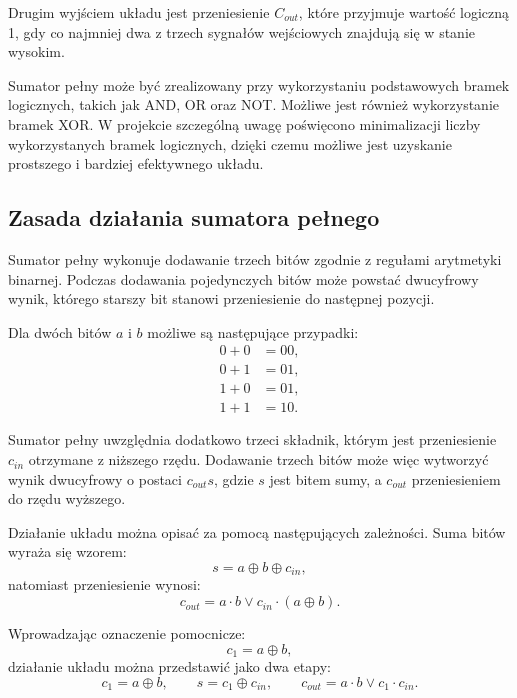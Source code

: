 Drugim wyjściem układu jest przeniesienie $C_{out}$, które przyjmuje wartość logiczną 1, gdy co najmniej dwa z trzech sygnałów wejściowych znajdują się w stanie wysokim.

Sumator pełny może być zrealizowany przy wykorzystaniu podstawowych bramek logicznych, takich jak AND, OR oraz NOT. Możliwe jest również wykorzystanie bramek XOR. W projekcie szczególną uwagę poświęcono minimalizacji liczby wykorzystanych bramek logicznych, dzięki czemu możliwe jest uzyskanie prostszego i bardziej efektywnego układu.

\subsection{Zasada działania sumatora pełnego}

Sumator pełny wykonuje dodawanie trzech bitów zgodnie z regułami arytmetyki binarnej. Podczas dodawania pojedynczych bitów może powstać dwucyfrowy wynik, którego starszy bit stanowi przeniesienie do następnej pozycji.

Dla dwóch bitów $a$ i $b$ możliwe są następujące przypadki:
\begin{align*}
0 + 0 &= 00, \\
0 + 1 &= 01, \\
1 + 0 &= 01, \\
1 + 1 &= 10.
\end{align*}

Sumator pełny uwzględnia dodatkowo trzeci składnik, którym jest przeniesienie $c_{in}$ otrzymane z niższego rzędu. Dodawanie trzech bitów może więc wytworzyć wynik dwucyfrowy o postaci $c_{out}s$, gdzie $s$ jest bitem sumy, a $c_{out}$ przeniesieniem do rzędu wyższego.

Działanie układu można opisać za pomocą następujących zależności. Suma bitów wyraża się wzorem:
\begin{equation*}
s = a \oplus b \oplus c_{in},
\end{equation*}
natomiast przeniesienie wynosi:
\begin{equation*}
c_{out} = a \cdot b \vee c_{in} \cdot (a \oplus b).
\end{equation*}

Wprowadzając oznaczenie pomocnicze:
\begin{equation*}
c_1 = a \oplus b,
\end{equation*}
działanie układu można przedstawić jako dwa etapy:
\begin{equation*}
c_1 = a \oplus b, \qquad s = c_1 \oplus c_{in}, \qquad c_{out} = a \cdot b \vee c_1 \cdot c_{in}.
\end{equation*}

